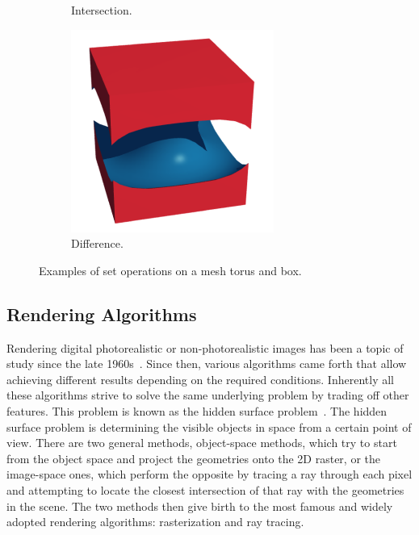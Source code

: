 \documentclass[a4paper,11pt,oneside]{article}
\begin{document}
\begin{figure}[ht]
\begin{subfigure}[b]{0.3\textwidth}
		\caption{Intersection.}
		\label{sec1:intersection}
	\end{subfigure}
	\hfill
	\begin{subfigure}[b]{0.3\textwidth}
		\centering
		\includegraphics[width=\textwidth]{section1/difference.png}
		\caption{Difference.}
		\label{sec1:difference}
	\end{subfigure}
	\hfill
	\caption{Examples of set operations on a mesh torus and box.}
	\label{sec1:set-operations-examples}
\end{figure}

  
\subsection{Rendering Algorithms}
  
Rendering digital photorealistic or non-photorealistic images has been a topic of study since the late 1960s~\cite{INITIAL_RENDERING}. Since then, various algorithms came forth that allow achieving different results depending on the required conditions. Inherently all these algorithms strive to solve the same underlying problem by trading off other features. This problem is known as the hidden surface problem~\cite{hidden-surface-problem}. The hidden surface problem is determining the visible objects in space from a certain point of view. There are two general methods, object-space methods, which try to start from the object space and project the geometries onto the 2D raster, or the image-space ones, which perform the opposite by tracing a ray through each pixel and attempting to locate the closest intersection of that ray with the geometries in the scene. The two methods then give birth to the most famous and widely adopted rendering algorithms: rasterization and ray tracing.
  
\end{document}
